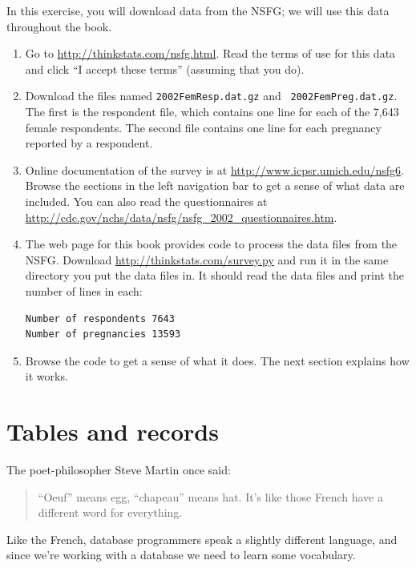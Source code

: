 \documentclass[12pt]{book}
\begin{document}
\begin{exercise}

In this exercise, you will download data from the NSFG; we will use
this data throughout the book.

\begin{enumerate}

\item Go to \url{http://thinkstats.com/nsfg.html}.  Read the terms of
use for this data and click ``I accept these terms'' (assuming that you do).

\item Download the files named {\tt 2002FemResp.dat.gz} and {\tt
  2002FemPreg.dat.gz}.  The first is the respondent file, which contains
  one line for each of the 7,643 female respondents.
  The second file contains one line for each pregnancy reported by a
  respondent.

\item Online documentation of the survey is at
  \url{http://www.icpsr.umich.edu/nsfg6}.
  Browse the sections in the left navigation bar to get a sense of
  what data are included.  You can also read the questionnaires
  at \url{http://cdc.gov/nchs/data/nsfg/nsfg_2002_questionnaires.htm}.

\item The web page for this book provides code to process the data
  files from the NSFG.  Download \url{http://thinkstats.com/survey.py}
  and run it in the same directory you put the data files in.  It
  should read the data files and print the number of lines in each:
%
\begin{verbatim}
Number of respondents 7643
Number of pregnancies 13593
\end{verbatim}

\item Browse the code to get a sense of what it does.  The next
section explains how it works.

\end{enumerate}

\end{exercise}

\section{Tables and records}

The poet-philosopher Steve Martin once said:
%
\begin{quote}
``Oeuf'' means egg, ``chapeau'' means hat.  It's like those French
  have a different word for everything.
\end{quote}
%
Like the French, database programmers speak a slightly
different language, and since we're working with a database we need
to learn some vocabulary.
\end{document}
